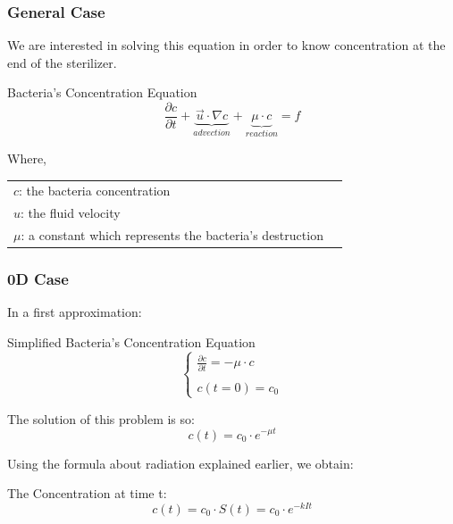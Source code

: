 \documentclass[xcolor=dvipsnames,10pt]{beamer}
\begin{document}
  \begin{frame}
          \frametitle{General Case}
          We are interested in solving this equation in order to know concentration at the end of the sterilizer. \\
          \begin{block}{Bacteria's Concentration Equation}
                  \begin{equation}
                          \frac{\partial{c}}{\partial{t}} + \underbrace{\vec{u}\cdot \nabla c}_{advection} + \underbrace{\mu\cdot c}_{reaction} = f
                  \end{equation}
          \end{block}
  Where,
          {\footnotesize
          \begin{tabular}{ll}
                  $c$: the bacteria concentration\\
                  $u$: the fluid velocity\\
                  $\mu$: a constant which represents the bacteria's destruction
          \end{tabular}
          }
  \end{frame}


  \begin{frame}
          \frametitle{0D Case}
          In a first approximation:
          \begin{block}{Simplified Bacteria's Concentration Equation}
                  \begin{equation}
                          \left\{ \begin{array}{cl}
                          \frac{\partial{c}}{\partial{t}}= -\mu\cdot c\\
                          \\
                          c(t=0)=c_0
                          \end{array}
                          \right.
                  \end{equation}

           The solution of this problem is so: 
          \begin{equation}
                  c(t) = c_0\cdot e^{-\mu t}
          \end{equation}
          \end{block}

          Using the formula about radiation explained earlier, we obtain: 
          \begin{block}{The Concentration at time t:}
                  \begin{equation}
                          c(t) = c_0\cdot S(t) = c_0\cdot e^{-kIt}
                  \end{equation}
          \end{block}
  \end{frame}
\end{document}
